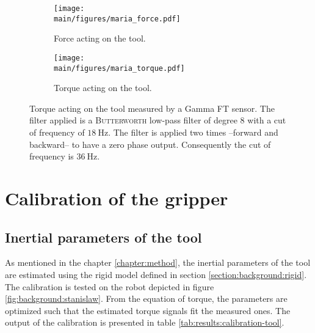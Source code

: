 \documentclass[/home/francois/latex/report/main.tex]{subfiles}
\begin{document}
\begin{figure}[h]
\centering
\begin{subfigure}{0.6\textwidth}
\centering
\texttt{[image: \\main/figures/maria\_force.pdf]}
\caption{Force acting on the tool.}
\label{fig:results:force}
\end{subfigure}
\begin{subfigure}{0.6\textwidth}
\centering
\texttt{[image: \\main/figures/maria\_torque.pdf]}
\caption{Torque acting on the tool.}
\label{fig:results:torque}
\end{subfigure}
\caption{Torque acting on the tool measured by a Gamma \ac{FT} sensor. The  filter applied is a \textsc{Butterworth} low-pass filter of degree 8 with a cut of frequency of $18 \ \si{\hertz}$. The filter is applied two times –forward and backward– to have a zero phase output. Consequently the cut of frequency is $36 \ \si{\hertz}$. \label{fig:results:force-torque}}
\end{figure}

\section{Calibration of the gripper}
\label{section:results:calibration}

\subsection{Inertial parameters of the tool}

As mentioned in the chapter \ref{chapter:method}, the inertial parameters of the tool are estimated using the rigid model defined in section \ref{section:background:rigid}. The calibration is tested on the robot depicted in figure \ref{fig:background:stanislaw}. From the equation of torque, the parameters are optimized such that the estimated torque signals fit the measured ones. The output of the calibration is presented in table \ref{tab:results:calibration-tool}.
\end{document}
